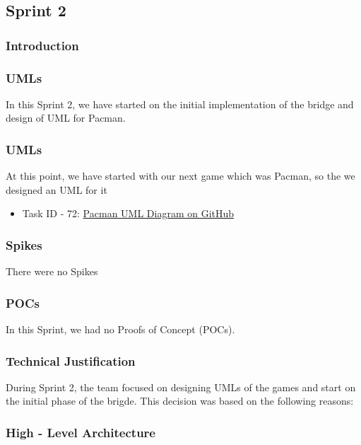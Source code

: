 \subsection{Sprint 2}

\subsubsection{Introduction}

\subsubsection{UMLs}

In this Sprint 2, we have started on the initial implementation of the bridge and design of UML for Pacman.

\subsubsection{UMLs}

At this point, we have started with our next game which was Pacman, so the we designed an UML for it

\begin{itemize}
    \item Task ID - 72: \href{https://github.com/Pending-Name-21/arquitecture/pull/11}{Pacman UML Diagram on GitHub}
\end{itemize}

\subsubsection{Spikes}

There were no Spikes

\subsubsection{POCs}

In this Sprint, we had no Proofs of Concept (POCs).

\subsubsection{Technical Justification}

During Sprint 2, the team focused on designing UMLs of the games
and start on the initial phase of the brigde. This decision was based on the following reasons:

\subsubsection{High - Level Architecture}

